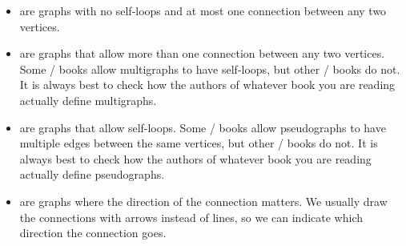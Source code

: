 \documentclass[../../../main.tex]{subfiles}
\begin{document}
\begin{itemize}

  \item {} are graphs with no self-loops and at most one connection between any two vertices.
  
  \item {} are graphs that allow more than one connection between any two vertices. Some \math/ books allow multigraphs to have self-loops, but other \math/ books do not. It is always best to check how the authors of whatever book you are reading actually define multigraphs.
  
  \item {} are graphs that allow self-loops. Some \math/ books allow pseudographs to have multiple edges between the same vertices, but other \math/ books do not. It is always best to check how the authors of whatever book you are reading actually define pseudographs.
  
  \item {} are graphs where the direction of the connection matters. We usually draw the connections with arrows instead of lines, so we can indicate which direction the connection goes.

\end{itemize}
\end{document}
